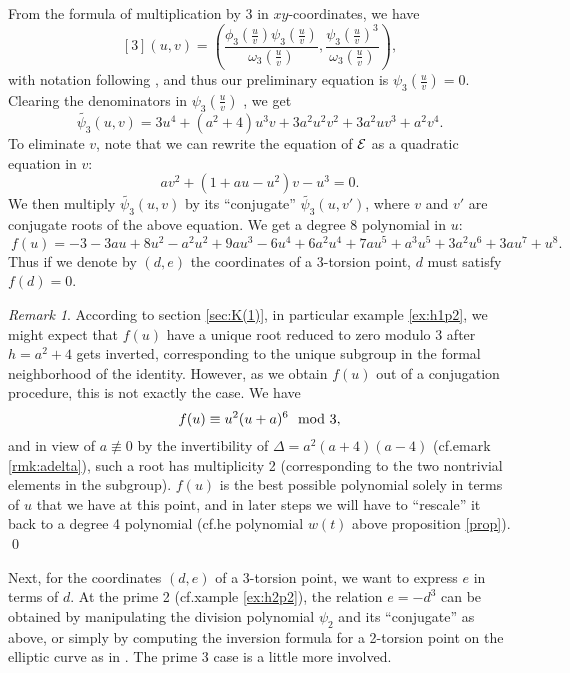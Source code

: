 \documentclass{gtpart}
\theoremstyle{definition}
\theoremstyle{remark}
\newtheorem{rmk}[thm]{Remark}
\begin{document}
From the formula of multiplication by 3 in $xy$-coordinates, we have 
\[
 [3](u,v) = \left( 
 \frac{\phi_3(\frac{u}{v})\psi_3(\frac{u}{v})}{\omega_3(\frac{u}{v})}, 
 \frac{\psi_3(\frac{u}{v})^3}{\omega_3(\frac{u}{v})}\right), 
\]
with notation following \cite[exercise 3.7(d)]{AEC}, and thus our preliminary 
equation is $\psi_3(\frac{u}{v}) = 0$.  Clearing the denominators in 
$\psi_3(\frac{u}{v})$ , we get 
\[
 \widetilde{\psi_3}(u,v) = 3u^4 + (a^2 + 4) u^3 v + 3a^2 u^2 v^2 + 3a^2 u v^3 
 + a^2 v^4.  
\]
To eliminate $v$, note that we can rewrite the equation of $\cal E$ as a 
quadratic equation in $v$: 
\[
 a v^2 + (1 + a u - u^2) v - u^3 = 0.  
\]
We then multiply $\widetilde{\psi_3}(u,v)$ by its ``conjugate'' 
$\widetilde{\psi_3}(u,v')$, where $v$ and $v'$ are conjugate roots of the 
above equation.  We get a degree 8 polynomial in $u$: 
\[
 ~f(u) = -3 - 3 a u + 8 u^2 - a^2 u^2 + 9 a u^3 - 6 u^4 + 6 a^2 u^4 + 7 a u^5 
 + a^3 u^5 + 3 a^2 u^6 + 3 a u^7 + u^8.  
\]
Thus if we denote by $(d,e)$ the coordinates of a 3-torsion point, $d$ must 
satisfy $f(d) = 0$.  
\begin{rmk}
\label{rmk:rescale}
 According to section \ref{sec:K(1)}, in particular example \ref{ex:h1p2}, we 
 might expect that $f(u)$ have a unique root reduced to zero modulo 3 after 
 $h = a^2 + 4$ gets inverted, corresponding to the unique subgroup in the 
 formal neighborhood of the identity.  However, as we obtain $f(u)$ out of a 
 conjugation procedure, this is not exactly the case.  We have 
 \[
  f(u) \equiv u^2 (u + a)^6~~{\rm mod}~3, 
 \]
 and in view of $a \not\equiv 0$ by the invertibility of $\Delta = 
 a^2(a + 4)(a - 4)$ (cf.emark \ref{rmk:adelta}), such a root has 
 multiplicity 2 (corresponding to the two nontrivial elements in the 
 subgroup).  $f(u)$ is the best possible polynomial solely in terms of $u$ 
 that we have at this point, and in later steps we will have to ``rescale'' it 
 back to a degree 4 polynomial (cf.he polynomial $w(t)$ above 
 proposition \ref{prop}).  \qed
\end{rmk}

Next, for the coordinates $(d,e)$ of a 3-torsion point, we want to express $e$ 
in terms of $d$.  At the prime 2 (cf.xample \ref{ex:h2p2}), the 
relation $e = -d^3$ can be obtained by manipulating the division polynomial 
$\psi_2$ and its ``conjugate'' as above, or simply by computing the inversion 
formula for a 2-torsion point on the elliptic curve as in 
\cite[section 3]{h2p2}.  The prime 3 case is a little more involved.  
\end{document}
